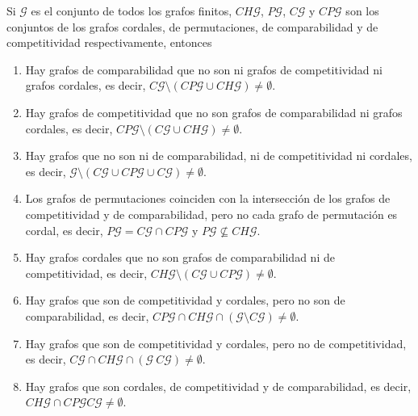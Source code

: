 \begin{teo}
Si $\mathcal{G}$ es el conjunto de todos los grafos finitos, $CH\mathcal{G}$, $P\mathcal{G}$, $C\mathcal{G}$ y $CP\mathcal{G}$ son los conjuntos de los grafos cordales, de permutaciones, de comparabilidad y de competitividad respectivamente, entonces
\begin{enumerate}
\item Hay grafos de comparabilidad que no son ni grafos de competitividad ni grafos cordales, es decir, $C\mathcal{G} \setminus (CP\mathcal{G} \cup CH\mathcal{G}) \neq \emptyset$.

\item Hay grafos de competitividad que no son grafos de comparabilidad ni grafos cordales, es decir, $CP\mathcal{G} \setminus (C\mathcal{G}\cup CH\mathcal{G}) \neq \emptyset$.

\item Hay grafos que no son ni de comparabilidad, ni de competitividad ni cordales, es decir, $\mathcal{G} \setminus (C\mathcal{G} \cup CP\mathcal{G} \cup C\mathcal{G}) \neq \emptyset$.

\item Los grafos de permutaciones coinciden con la intersección de los grafos de competitividad y de comparabilidad, pero no cada grafo de permutación es cordal, es decir, $P\mathcal{G} = C\mathcal{G}\cap CP\mathcal{G}$ y $P\mathcal{G} \not \subseteq CH\mathcal{G}$.

\item Hay grafos cordales que no son grafos de comparabilidad ni de competitividad, es decir, $CH\mathcal{G} \setminus (C\mathcal{G} \cup CP\mathcal{G}) \neq \emptyset$.

\item Hay grafos que son de competitividad y cordales, pero no son de comparabilidad, es decir, $CP\mathcal{G} \cap CH\mathcal{G} \cap (\mathcal{G} \setminus C\mathcal{G}) \neq \emptyset$.

\item Hay grafos que son de competitividad y cordales, pero no de competitividad, es decir, $C\mathcal{G} \cap CH\mathcal{G} \cap (\mathcal{G} \ C\mathcal{G}) \neq \emptyset$.

\item Hay grafos que son cordales, de competitividad y de comparabilidad, es decir, $CH\mathcal{G} \cap CP\mathcal{G} C\mathcal{G} \neq \emptyset$.
\end{enumerate}
\end{teo}

